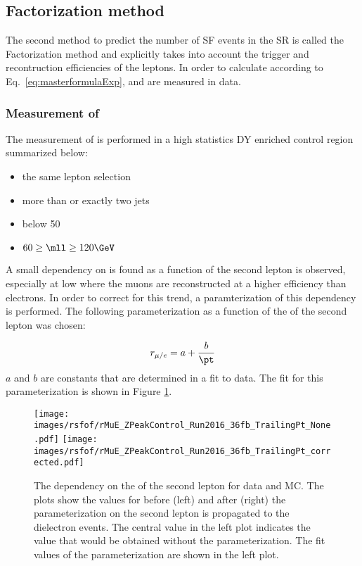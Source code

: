 \subsection{Factorization method}\label{sec:factorizationMethod}
The second method to predict the number of SF events in the SR is called the Factorization method and explicitly takes into account the trigger and recontruction efficiencies of the leptons.   
In order to calculate \Rsfof according to Eq.~\ref{eq:masterformulaExp}, \rmue and \RT are measured in data.
\subsubsection{Measurement of \rmue}

The measurement of \rmue is performed in a high statistics DY enriched control region summarized below:
\begin{itemize}
    \item the same lepton selection
    \item more than or exactly two jets
    \item \ptmiss below 50\GeV
    \item $60\geq\mll\geq120\GeV$
\end{itemize}                                 
 
A small dependency on \rmue is found as a function of the second lepton \pt is observed, especially at low \pt where the muons are reconstructed at a higher efficiency than electrons.  
In order to correct for this trend, a paramterization of this dependency is performed. The following parameterization as a function of the \pt of the second lepton was chosen:

\begin{equation}
    r_{\mu/e}  = a +  \frac{b}{\pt}
\label{eq:rMuEFormular}
\end{equation}
$a$ and $b$ are constants that are determined in a fit to data.
The fit for this parameterization is shown in Figure \ref{fig:rMuEDependency}.

\begin{figure}[htbp!]
\begin{center}
    \texttt{[image: images/rsfof/rMuE\_ZPeakControl\_Run2016\_36fb\_TrailingPt\_None.pdf]}
    \texttt{[image: images/rsfof/rMuE\_ZPeakControl\_Run2016\_36fb\_TrailingPt\_corrected.pdf]}
    \caption{The \rmue dependency on the \pt of the second lepton for data and MC. The plots show the values for \rmue before (left) and after (right) the parameterization on the second lepton \pt is propagated to the dielectron events. The central value in the left plot indicates the \rmue value that would be obtained without the parameterization. The fit values of the parameterization are shown in the left plot.}
\label{fig:rMuEDependency}
\end{center}
\end{figure}                                                                                                                

